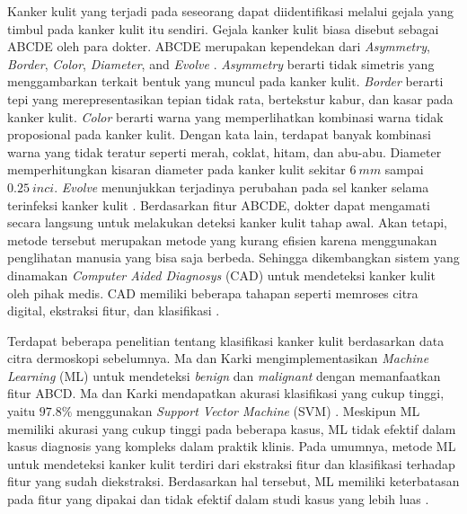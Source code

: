     Kanker kulit yang terjadi pada seseorang dapat diidentifikasi melalui gejala yang timbul pada kanker kulit itu sendiri. Gejala kanker kulit biasa disebut sebagai ABCDE oleh para dokter. ABCDE merupakan kependekan dari \textit{Asymmetry}, \textit{Border}, \textit{Color}, \textit{Diameter}, and \textit{Evolve} \citep{Gavrilov2019a}. \textit{Asymmetry} berarti tidak simetris yang menggambarkan terkait bentuk yang muncul pada kanker kulit. \textit{Border} berarti tepi yang merepresentasikan tepian tidak rata, bertekstur kabur, dan kasar pada kanker kulit. \textit{Color} berarti warna yang memperlihatkan kombinasi warna tidak proposional pada kanker kulit. Dengan kata lain, terdapat banyak kombinasi warna yang tidak teratur seperti merah, coklat, hitam, dan abu-abu. Diameter memperhitungkan kisaran diameter pada kanker kulit sekitar $6\ mm$ sampai $0.25\ inci$. \textit{Evolve} menunjukkan terjadinya perubahan pada sel kanker selama terinfeksi kanker kulit \citep{Saherish2020a}. Berdasarkan fitur ABCDE, dokter dapat mengamati secara langsung untuk melakukan deteksi kanker kulit tahap awal. Akan tetapi, metode tersebut merupakan metode yang kurang efisien karena menggunakan penglihatan manusia yang bisa saja berbeda. Sehingga dikembangkan sistem yang dinamakan \textit{Computer Aided Diagnosys} (CAD) untuk mendeteksi kanker kulit oleh pihak medis. CAD memiliki beberapa tahapan seperti memroses citra digital, ekstraksi fitur, dan klasifikasi \citep{Adyanti2017}.

    Terdapat beberapa penelitian tentang klasifikasi kanker kulit berdasarkan data citra dermoskopi sebelumnya. Ma dan Karki mengimplementasikan \textit{Machine Learning} (ML) untuk mendeteksi \textit{benign} dan \textit{malignant} dengan memanfaatkan fitur ABCD. Ma dan Karki mendapatkan akurasi klasifikasi yang cukup tinggi, yaitu $97.8\%$ menggunakan \textit{Support Vector Machine} (SVM) \citep{Ma2020}. Meskipun ML memiliki akurasi yang cukup tinggi pada beberapa kasus, ML tidak efektif dalam kasus diagnosis yang kompleks dalam praktik klinis. Pada umumnya, metode ML untuk mendeteksi kanker kulit terdiri dari ekstraksi fitur dan klasifikasi terhadap fitur yang sudah diekstraksi. Berdasarkan hal tersebut, ML memiliki keterbatasan pada fitur yang dipakai dan tidak efektif dalam studi kasus yang lebih luas \citep{Wu2022}.

